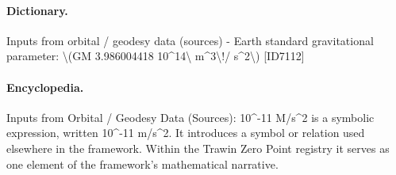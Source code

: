 \paragraph{Dictionary.}
Inputs from orbital / geodesy data (sources) - Earth standard gravitational parameter: \textbackslash{}(GM 3.986004418 10\textasciicircum{}14\textbackslash{} m\textasciicircum{}3\textbackslash{}!/ s\textasciicircum{}2\textbackslash{}) [ID7112]

\paragraph{Encyclopedia.}
Inputs from Orbital / Geodesy Data (Sources): 10\textasciicircum{}-11 M/s\textasciicircum{}2 is a symbolic expression, written 10\textasciicircum{}-11 m/s\textasciicircum{}2. It introduces a symbol or relation used elsewhere in the framework. Within the Trawin Zero Point registry it serves as one element of the framework's mathematical narrative.
